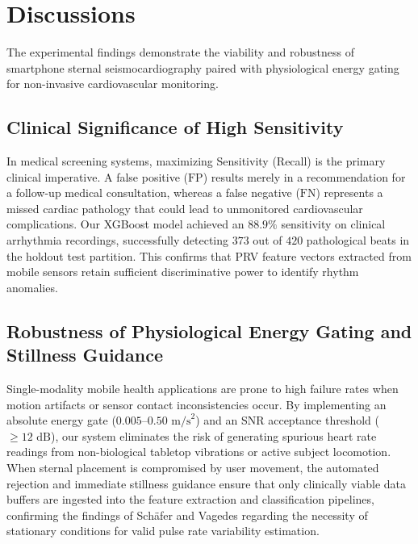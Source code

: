 \section{Discussions}

The experimental findings demonstrate the viability and robustness of smartphone sternal seismocardiography paired with physiological energy gating for non-invasive cardiovascular monitoring.

\subsection{Clinical Significance of High Sensitivity}
In medical screening systems, maximizing Sensitivity (Recall) is the primary clinical imperative. A false positive ($\text{FP}$) results merely in a recommendation for a follow-up medical consultation, whereas a false negative ($\text{FN}$) represents a missed cardiac pathology that could lead to unmonitored cardiovascular complications. Our XGBoost model achieved an $88.9\%$ sensitivity on clinical arrhythmia recordings, successfully detecting $373$ out of $420$ pathological beats in the holdout test partition. This confirms that PRV feature vectors extracted from mobile sensors retain sufficient discriminative power to identify rhythm anomalies.

\subsection{Robustness of Physiological Energy Gating and Stillness Guidance}
Single-modality mobile health applications are prone to high failure rates when motion artifacts or sensor contact inconsistencies occur. By implementing an absolute energy gate ($0.005\text{--}0.50\text{ m/s}^2$) and an SNR acceptance threshold ($\ge 12\text{ dB}$), our system eliminates the risk of generating spurious heart rate readings from non-biological tabletop vibrations or active subject locomotion. When sternal placement is compromised by user movement, the automated rejection and immediate stillness guidance ensure that only clinically viable data buffers are ingested into the feature extraction and classification pipelines, confirming the findings of Schäfer and Vagedes \cite{schafer2013accurate} regarding the necessity of stationary conditions for valid pulse rate variability estimation.

